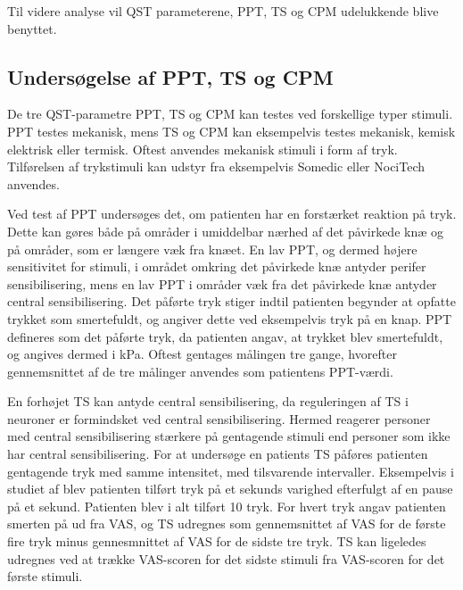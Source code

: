 Til videre analyse vil QST parameterene, PPT, TS og CPM udelukkende blive benyttet.

\subsection{Undersøgelse af PPT, TS og CPM}
De tre QST-parametre PPT, TS og CPM kan testes ved forskellige typer stimuli. PPT testes mekanisk, mens TS og CPM kan eksempelvis testes mekanisk, kemisk elektrisk eller termisk. Oftest anvendes mekanisk stimuli i form af tryk. \citep{Suokas2012} \citep{Yarnitsky2006} Tilførelsen af trykstimuli kan udstyr fra eksempelvis Somedic eller NociTech anvendes. \citep{Wylde2015} \citep{Petersen2016} 

Ved test af PPT undersøges det, om patienten har en forstærket reaktion på tryk. Dette kan gøres både på områder i umiddelbar nærhed af det påvirkede knæ og på områder, som er længere væk fra knæet. En lav PPT, og dermed højere sensitivitet for stimuli, i området omkring det påvirkede knæ antyder perifer sensibilisering, mens en lav PPT i områder væk fra det påvirkede knæ antyder central sensibilisering. \citep{Suokas2012} Det påførte tryk stiger indtil patienten begynder at opfatte trykket som smertefuldt, og angiver dette ved eksempelvis tryk på en knap. PPT defineres som det påførte tryk, da patienten angav, at trykket blev smertefuldt, og angives dermed i kPa. Oftest gentages målingen tre gange, hvorefter gennemsnittet af de tre målinger anvendes som patientens PPT-værdi. \citep{Petersen2015b} \citep{Wylde2015} 

En forhøjet TS kan antyde central sensibilisering, da reguleringen af TS i neuroner er formindsket ved central sensibilisering. \citep{Arendt-Nielsen2015b} Hermed reagerer personer med central sensibilisering stærkere på gentagende stimuli end personer som ikke har central sensibilisering. \citep{Arendt-Nielsen2015b} For at undersøge en patients TS påføres patienten gentagende tryk med samme intensitet, med tilsvarende intervaller. Eksempelvis i studiet af \citep{Petersen2016} blev patienten tilført tryk på et sekunds varighed efterfulgt af en pause på et sekund. Patienten blev i alt tilført 10 tryk. For hvert tryk angav patienten smerten på ud fra VAS, og TS udregnes som gennemsnittet af VAS for de første fire tryk minus gennesmnittet af VAS for de sidste tre tryk. \citep{Petersen2016} TS kan ligeledes udregnes ved at trække VAS-scoren for det sidste stimuli fra VAS-scoren for det første stimuli. \citep{Petersen2015b} 

